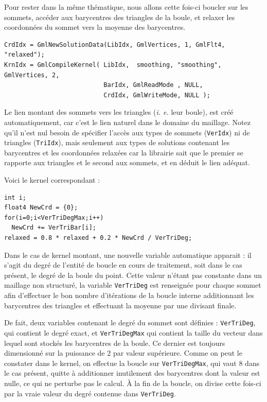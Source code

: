\documentclass[a4paper,12pt]{article}
\begin{document}
Pour rester dans la même thématique, nous allons cette fois-ci boucler sur les sommets, accéder aux barycentres des triangles de la boule, et relaxer les coordonnées du sommet vers la moyenne des barycentres.

\begin{tt}
\begin{verbatim}
CrdIdx = GmlNewSolutionData(LibIdx, GmlVertices, 1, GmlFlt4, "relaxed");
KrnIdx = GmlCompileKernel( LibIdx,  smoothing, "smoothing", GmlVertices, 2,
                           BarIdx, GmlReadMode , NULL,
                           CrdIdx, GmlWriteMode, NULL );
\end{verbatim}
\end{tt}
\normalfont

Le lien montant des sommets vers les triangles (\emph{i. e.} leur boule), est créé automatiquement, car c'est le lien naturel dans le domaine du maillage.
Notez qu'il n'est nul besoin de spécifier l'accès aux types de sommets ({\tt VerIdx}) ni de triangles ({\tt TriIdx}), mais seulement aux types de solutions contenant les barycentres et les coordonnées relaxées car la librairie sait que le premier se rapporte aux triangles et le second aux sommets, et en déduit le lien adéquat.

Voici le kernel correspondant :
\begin{tt}
\begin{verbatim}
int i;
float4 NewCrd = {0};
for(i=0;i<VerTriDegMax;i++)
  NewCrd += VerTriBar[i];
relaxed = 0.8 * relaxed + 0.2 * NewCrd / VerTriDeg;
\end{verbatim}
\end{tt}
\normalfont

Dans le cas de kernel montant, une nouvelle variable automatique apparait : il s'agit du degré de l'entité de boucle en cours de traitement, soit dans le cas présent, le degré de la boule du point.
Cette valeur n'étant pas constante dans un maillage non structuré, la variable {\tt VerTriDeg} est renseignée pour chaque sommet afin d'effectuer le bon nombre d'itérations de la boucle interne additionnant les barycentres des triangles et effectuant la moyenne par une divisant finale.

De fait, deux variables contenant le degré du sommet sont définies : {\tt VerTriDeg}, qui contient le degré exact, et {\tt VerTriDegMax} qui contient la taille du vecteur dans lequel sont stockés les barycentres de la boule.
Ce dernier est toujours dimensionné sur la puissance de 2 par valeur supérieure.
Comme on peut le constater dans le kernel, on effectue la boucle sur {\tt VerTriDegMax}, qui vaut 8 dans le cas présent, quitte à additionner inutilement des barycentres dont la valeur est nulle, ce qui ne perturbe pas le calcul.
À la fin de la boucle, on divise cette fois-ci par la vraie valeur du degré contenue dans {\tt VerTriDeg}.
\end{document}
